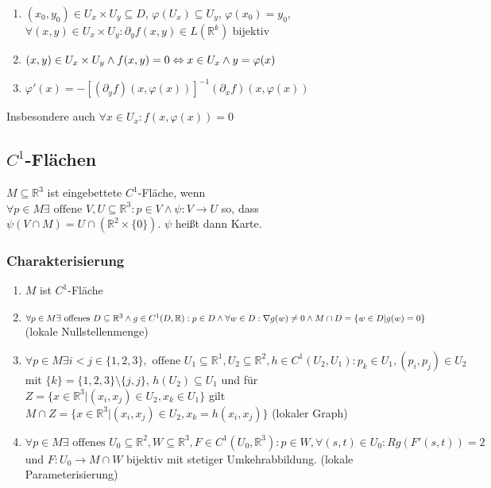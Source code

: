 \begin{enumerate}[label=(\alph*)]
	\item $(x_0, y_0) \in U_x \times U_y \subseteq D$, $\varphi(U_x) \subseteq U_y$, $\varphi(x_0)=y_0$, $\forall (x, y) \in U_x \times U_y : \partial_y f(x,y) \in L(\mathbb{R}^k)$ bijektiv
	\item $(x, y) \in U_x \times U_y \land f(x,y)=0 \\ \Leftrightarrow x \in U_x \land y=\varphi(x)$
	\item $\varphi'(x) = -[(\partial_y f)(x, \varphi(x))]^{-1}(\partial_x f)(x, \varphi(x))$
\end{enumerate}

Insbesondere auch $\forall x \in U_x : f(x, \varphi(x))=0$

\subsection*{$C^1$-Flächen}

$M \subseteq \mathbb{R}^3$ ist eingebettete $C^1$-Fläche, wenn $\forall p \in M \exists \text{ offene } V, U \subseteq \mathbb{R}^3 : p \in V \land \psi : V \rightarrow U$ so, dass $\psi(V \cap M) = U \cap (\mathbb{R}^2 \times \{0\})$. $\psi$ heißt dann Karte.

\subsubsection*{Charakterisierung}

\begin{enumerate}[label=(\alph*)]
	\item $M$ ist $C^1$-Fläche
	\item $\forall p \in M \exists \text{ offenes } D \subseteq \mathbb{R}^3 \land g \in C^1(D, \mathbb{R}) : \\ p \in D \land \forall w \in D : \nabla g(w) \neq 0 \land M \cap D = \{w\in D | g(w) = 0\}$ (lokale Nullstellenmenge)
	\item $\forall p \in M \exists i < j \in \{1, 2, 3\}, \text{ offene } U_1 \subseteq \mathbb{R}^1, U_2 \subseteq \mathbb{R}^2, h \in C^1(U_2, U_1) : p_k \in U_1, (p_i, p_j) \in U_2$ mit $\{k\} = \{1, 2, 3\} \setminus \{j, j\}$, $h(U_2) \subseteq U_1$ und für $Z=\{x \in \mathbb{R}^3 | (x_i, x_j) \in U_2, x_k \in U_1\}$ gilt $M \cap Z = \{x \in \mathbb{R}^3 | (x_i, x_j) \in U_2, x_k = h(x_i, x_j)\}$ (lokaler Graph)
	\item $\forall p \in M \exists \text{ offenes } U_0 \subseteq \mathbb{R}^2, W \subseteq \mathbb{R}^3, F \in C^1(U_0, \mathbb{R}^3) : p \in W, \forall (s, t) \in U_0 : Rg(F'(s, t)) = 2$ und $F: U_0 \rightarrow M \cap W$ bijektiv mit stetiger Umkehrabbildung. (lokale Parameterisierung)
\end{enumerate}

